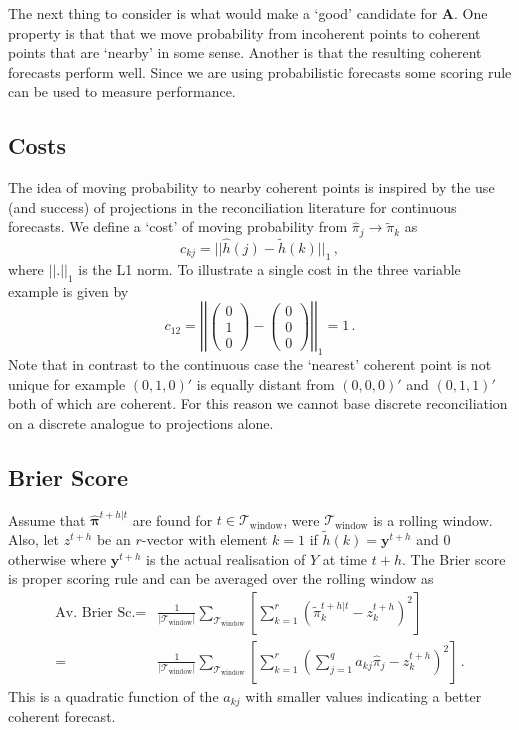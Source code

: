 \documentclass[a4paper,review,12pt,authoryear]{elsarticle}
\newcommand{\bpi}{\bm{\pi}}
\begin{document}
    The next thing to consider is what would make a `good' candidate for $\bm{A}$.  One property is that that we move probability from incoherent points to coherent points that are  `nearby' in some sense. Another is that the resulting coherent forecasts perform well.  Since we are using probabilistic forecasts some scoring rule can be used to measure performance.
    
    \subsection{Costs}
    
    The idea of moving probability to nearby coherent points is inspired by the use (and success) of projections in the reconciliation literature for continuous forecasts. We define a `cost' of moving probability from $\hat{\pi}_j\rightarrow\tilde{\pi}_k$ as
    \[
    c_{kj}=||\hat{h}(j)-\tilde{h}(k)||_1\,,
    \]
    where $||.||_1$ is the L1 norm. To illustrate a single cost in the three variable example is given by
    \[
    c_{12}=\left|\left|\begin{pmatrix}0\\1\\0\end{pmatrix}-\begin{pmatrix}0\\0\\0\end{pmatrix}\right|\right|_1=1\,.
    \]
    Note that in contrast to the continuous case the `nearest' coherent point is not unique for example $(0,1,0)'$ is equally distant from $(0,0,0)'$ and $(0,1,1)'$ both of which are coherent. For this reason we cannot base discrete reconciliation on a discrete analogue to projections alone.
    
    \subsection{Brier Score}
    
    Assume that $\hat{\bpi}^{t+h|t}$ are found for $t\in\mathcal{T}_{\textrm{window}}$, were $\mathcal{T}_{\textrm{window}}$ is a rolling window. Also, let $z^{t+h}$ be an $r$-vector with element $k=1$ if $\tilde{h}(k)=\bm{y}^{t+h}$ and $0$ otherwise where $\bm{y}^{t+h}$ is the actual realisation of $Y$ at time $t+h$. The Brier score is  proper scoring rule and can be averaged over the rolling window as
    \begin{align*}
    \textrm{Av. Brier Sc.}=&\frac{1}{|\mathcal{T}_{\textrm{window}}|}\sum\limits_{\mathcal{T}_{\textrm{window}}}\left[\sum\limits_{k=1}^r\left(\tilde{\pi}_k^{t+h|t}-z^{t+h}_k\right)^2\right]\\
    =&\frac{1}{|\mathcal{T}_{\textrm{window}}|}\sum\limits_{\mathcal{T}_{\textrm{window}}}\left[\sum\limits_{k=1}^r\left(\sum\limits_{j=1}^q a_{kj}\hat{{\pi}}_j-z^{t+h}_k\right)^2\right]\,.
    \end{align*}
    This is a quadratic function of the $a_{kj}$ with smaller values indicating a better coherent forecast.
    
\end{document}
